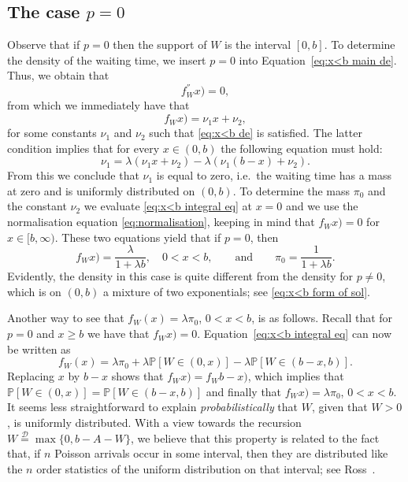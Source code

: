 \documentclass[reqno, 11pt, a4paper]{article}
\theoremstyle{plain}
\theoremstyle{remark}
\numberwithin{equation}{section}
\begin{document}
\subsection*{ The case $p=0$}
Observe that if $p=0$ then the support of $W$ is the interval $[0,b]$. To determine the density of the waiting time, we insert $p=0$ into Equation~\eqref{eq:x<b main de}. Thus, we obtain that
$$
{\mbox{$f_W^{''}$}}x)=0,
$$
from which we immediately have that
$$
{\mbox{$f_W^{}$}}x)=\nu_1x +\nu_2,
$$
for some constants $\nu_1$ and $\nu_2$ such that \eqref{eq:x<b de} is satisfied. The latter condition implies that for every $x \in(0,b)$ the following equation must hold:
$$
\nu_1=\lambda (\nu_1x +\nu_2)-\lambda (\nu_1 (b-x) +\nu_2).
$$
From this we conclude that $\nu_1$ is equal to zero, i.e.\ the waiting time has a mass at zero and is uniformly distributed on $(0,b)$. To determine the mass $\pi_0$ and the constant $\nu_2$ we evaluate \eqref{eq:x<b integral eq} at $x=0$ and we use the normalisation equation \eqref{eq:normalisation}, keeping in mind that ${\mbox{$f_W^{}$}}x)=0$ for $x\in[b,\infty)$. These two equations yield that if $p=0$, then
\begin{equation}\label{eq:density p=0}
{\mbox{$f_W^{}$}}x)=\frac{\lambda}{1+\lambda b},\quad 0<x<b, \qquad \mbox{and}\qquad \pi_0=\frac{1}{1+\lambda b}.
\end{equation}
Evidently, the density in this case is quite different from the density for $p\neq 0$, which is on $(0,b)$ a mixture of two exponentials; see \eqref{eq:x<b form of sol}.

Another way to see that $f_W(x) = \lambda \pi_0$, $0<x<b$, is as follows. Recall that for $p=0$ and $x\geqslant b$ we have that ${\mbox{$f_W^{}$}}x)=0$. Equation~\eqref{eq:x<b integral eq} can now be written as
$$
f_W(x) = \lambda \pi_0 + \lambda {\mathbb{P}}[W \in (0,x)] - \lambda {\mathbb{P}}[W \in (b-x,b)].
$$
Replacing $x$ by $b-x$ shows that ${\mbox{$f_W^{}$}}x) = {\mbox{$f_W^{}$}}b-x)$, which implies that ${\mathbb{P}}[W \in (0,x)] = {\mathbb{P}}[W \in (b-x,b)]$ and finally that
${\mbox{$f_W^{}$}}x) = \lambda \pi_0$, $0<x<b$. It seems less straightforward to explain {\em probabilistically} that $W$, given that $W>0$, is uniformly distributed. With a view towards the recursion $W\stackrel{{\mathcal{{D}}}}{=}\max\{0, b-A-W\}$, we believe that this property is related to the fact that, if $n$ Poisson arrivals occur in some interval, then they are distributed like the $n$ order statistics of the uniform distribution on that interval; see Ross~\cite[Section 2.3]{ross-SP}.
\end{document}
